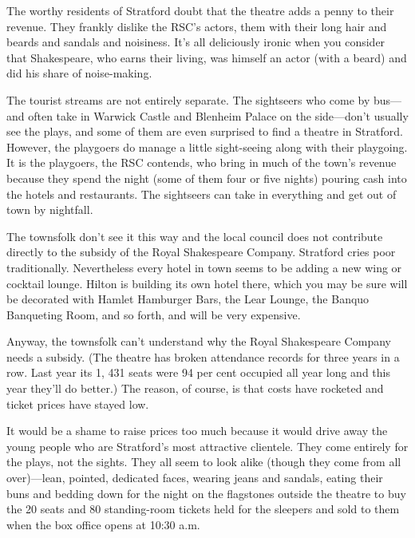 The worthy residents of Stratford doubt that the theatre adds a penny
to their revenue. They frankly dislike the RSC's actors, them with their
long hair and beards and sandals and noisiness. It's all deliciously
ironic when you consider that Shakespeare, who earns their living, was
himself an actor (with a beard) and did his share of noise-making.

The tourist streams are not entirely separate. The sightseers who come
by bus---and often take in Warwick Castle and Blenheim Palace on the
side---don't usually see the plays, and some of them are even surprised
to find a theatre in Stratford. However, the playgoers do manage a
little sight-seeing along with their playgoing. It is the playgoers, the
RSC contends, who bring in much of the town's revenue because they spend
the night (some of them four or five nights) pouring cash into the
hotels and restaurants. The sightseers can take in everything and get
out of town by nightfall.

The townsfolk don't see it this way and the local council does not
contribute directly to the subsidy of the Royal Shakespeare Company.
Stratford cries poor traditionally. Nevertheless every hotel in town
seems to be adding a new wing or cocktail lounge. Hilton is building its
own hotel there, which you may be sure will be decorated with Hamlet
Hamburger Bars, the Lear Lounge, the Banquo Banqueting Room, and so
forth, and will be very expensive.

Anyway, the townsfolk can't understand why the Royal Shakespeare Company
needs a subsidy. (The theatre has broken attendance records for three
years in a row. Last year its 1, 431 seats were 94 per cent occupied all
year long and this year they'll do better.) The reason, of course, is
that costs have rocketed and ticket prices have stayed low.

It would be a shame to raise prices too much because it would drive away
the young people who are Stratford's most attractive clientele. They
come entirely for the plays, not the sights. They all seem to look alike
(though they come from all over)---lean, pointed, dedicated faces,
wearing jeans and sandals, eating their buns and bedding down for the
night on the flagstones outside the theatre to buy the 20 seats and 80
standing-room tickets held for the sleepers and sold to them when the
box office opens at 10:30 a.m.


